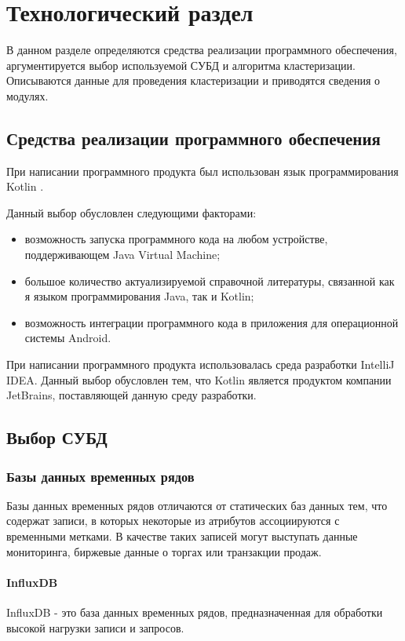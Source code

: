 \section{Технологический раздел}
В данном разделе определяются средства реализации программного обеспечения, аргументируется выбор используемой СУБД и алгоритма кластеризации. Описываются данные для проведения кластеризации и приводятся сведения о модулях.

\subsection{Средства реализации программного обеспечения}
При написании программного продукта был использован язык программирования Kotlin \cite{Kotlin}.

Данный выбор обусловлен следующими факторами:
\begin{itemize}[leftmargin=1.6\parindent]
\item возможность запуска программного кода на любом устройстве, поддерживающем Java Virtual Machine;
\item большое количество актуализируемой справочной литературы, связанной как я языком программирования Java, так и Kotlin;
\item возможность интеграции программного кода в приложения для операционной системы Android.
\end{itemize}

При написании программного продукта использовалась среда разработки IntelliJ IDEA. Данный выбор обусловлен тем, что Kotlin является продуктом компании JetBrains, поставляющей данную среду разработки.

\subsection{Выбор СУБД}

\subsubsection{Базы данных временных рядов}
Базы данных временных рядов отличаются от статических баз данных тем, что содержат записи, в которых некоторые из атрибутов ассоциируются с временными метками. В качестве таких записей могут выступать данные мониторинга, биржевые данные о торгах или транзакции продаж. \cite{bdvrAnomalies}

\paragraph{InfluxDB}
InfluxDB - это база данных временных рядов, предназначенная для обработки высокой нагрузки записи и запросов.

